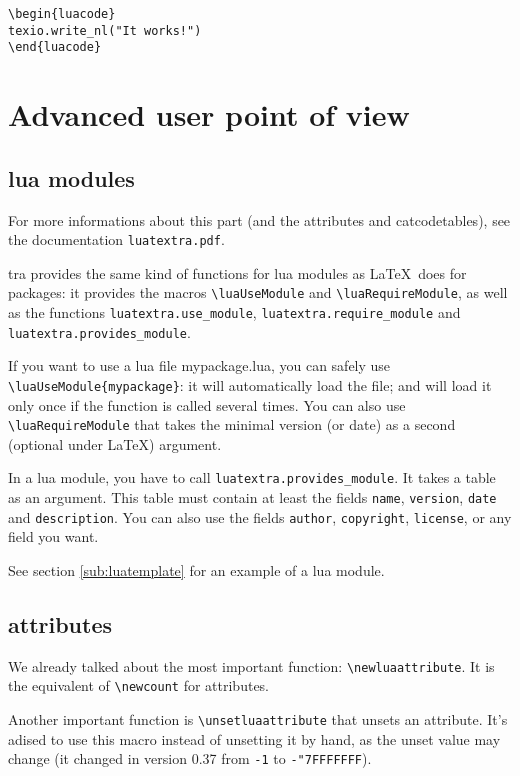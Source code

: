 \documentclass{article}
\newcommand\code{\texttt}
\begin{document}
\begin{verbatim}
\begin{luacode}
texio.write_nl("It works!")
\end{luacode}
\end{verbatim}

\section{Advanced user point of view}

\subsection{lua modules}

For more informations about this part (and the attributes and catcodetables),
see the documentation \code{luatextra.pdf}.

\LuaTeX tra provides the same kind of functions for lua modules as \LaTeX\
does for packages: it provides the macros \verb+\luaUseModule+ and
\verb+\luaRequireModule+, as well as the functions
\code{luatextra.use\_module}, \code{luatextra.require\_module} and
\code{luatextra.provides\_module}.

If you want to use a lua file mypackage.lua, you can safely use
\verb+\luaUseModule{mypackage}+: it will automatically load the
file; and will load it only once if the function is called several times. You
can also use \verb+\luaRequireModule+ that takes the minimal version
(or date) as a second (optional under \LaTeX ) argument.

In a lua module, you have to call \code{luatextra.provides\_module}. It
takes a table as an argument. This table must contain at least the fields
\code{name}, \code{version}, \code{date} and \code{description}. You
can also use the fields \code{author}, \code{copyright}, \code{license},
or any field you want.

See section \ref{sub:luatemplate} for an example of a lua module.

\subsection{attributes}

We already talked about the most important function:
\verb+\newluaattribute+. It is the equivalent of
\verb+\newcount+ for attributes.

Another important function is \verb+\unsetluaattribute+ that unsets
an attribute. It's adised to use this macro instead of unsetting it by hand,
as the unset value may change (it changed in version 0.37 from \code{-1} to
\code{-"7FFFFFFF}).
\end{document}
